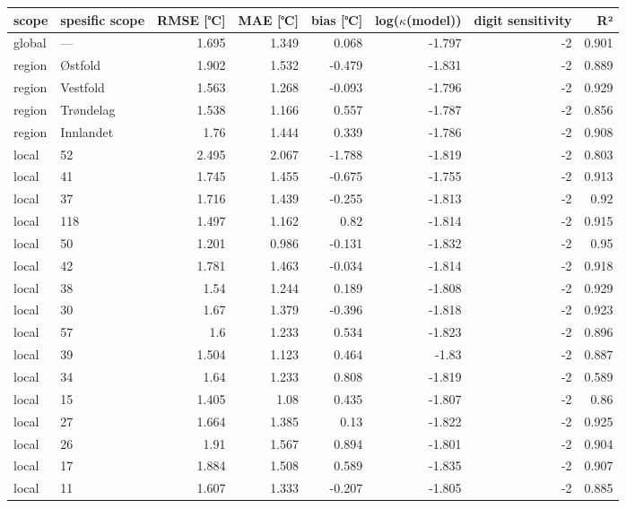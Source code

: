 \begin{tabular}{llrrrrrr}
\hline
 scope   & spesific
scope           &       RMSE
[℃] &   MAE [℃] &        bias
[℃] &   log($\kappa$(model)) &    digit
sensitivity &    R² \\
\hline
 global  & ---       & 1.695 &     1.349 &  0.068 &                 -1.797 & -2 & 0.901 \\
 region  & Østfold   & 1.902 &     1.532 & -0.479 &                 -1.831 & -2 & 0.889 \\
 region  & Vestfold  & 1.563 &     1.268 & -0.093 &                 -1.796 & -2 & 0.929 \\
 region  & Trøndelag & 1.538 &     1.166 &  0.557 &                 -1.787 & -2 & 0.856 \\
 region  & Innlandet & 1.76  &     1.444 &  0.339 &                 -1.786 & -2 & 0.908 \\
 local   & 52        & 2.495 &     2.067 & -1.788 &                 -1.819 & -2 & 0.803 \\
 local   & 41        & 1.745 &     1.455 & -0.675 &                 -1.755 & -2 & 0.913 \\
 local   & 37        & 1.716 &     1.439 & -0.255 &                 -1.813 & -2 & 0.92  \\
 local   & 118       & 1.497 &     1.162 &  0.82  &                 -1.814 & -2 & 0.915 \\
 local   & 50        & 1.201 &     0.986 & -0.131 &                 -1.832 & -2 & 0.95  \\
 local   & 42        & 1.781 &     1.463 & -0.034 &                 -1.814 & -2 & 0.918 \\
 local   & 38        & 1.54  &     1.244 &  0.189 &                 -1.808 & -2 & 0.929 \\
 local   & 30        & 1.67  &     1.379 & -0.396 &                 -1.818 & -2 & 0.923 \\
 local   & 57        & 1.6   &     1.233 &  0.534 &                 -1.823 & -2 & 0.896 \\
 local   & 39        & 1.504 &     1.123 &  0.464 &                 -1.83  & -2 & 0.887 \\
 local   & 34        & 1.64  &     1.233 &  0.808 &                 -1.819 & -2 & 0.589 \\
 local   & 15        & 1.405 &     1.08  &  0.435 &                 -1.807 & -2 & 0.86  \\
 local   & 27        & 1.664 &     1.385 &  0.13  &                 -1.822 & -2 & 0.925 \\
 local   & 26        & 1.91  &     1.567 &  0.894 &                 -1.801 & -2 & 0.904 \\
 local   & 17        & 1.884 &     1.508 &  0.589 &                 -1.835 & -2 & 0.907 \\
 local   & 11        & 1.607 &     1.333 & -0.207 &                 -1.805 & -2 & 0.885 \\
\hline
\end{tabular}